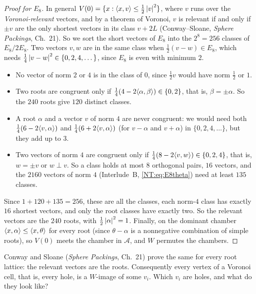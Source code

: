 \begin{proof}[Proof for $E_8$]
In general $V(0)=\{x:\langle x, v\rangle\le\frac12\left\lvert v \right\rvert^2\}$, where $v$ runs over the \emph{Voronoi-relevant} vectors,
and by a theorem of Voronoi, $v$ is relevant if and only if $\pm v$ are the only shortest vectors in its
class $v+2L$ (Conway--Sloane, \emph{Sphere Packings}, Ch.~21). So we sort the short vectors of $E_8$ into
the $2^8=256$ classes of $E_8/2E_8$. Two vectors $v,w$ are in the same class when $\frac12(v-w)\in E_8$,
which needs $\frac14\left\lvert v-w \right\rvert^2\in\{0,2,4,\dots\}$, since $E_8$ is even with minimum $2$.
\begin{itemize}[nosep]
\item No vector of norm $2$ or $4$ is in the class of $0$, since $\frac12v$ would have norm $\frac12$ or $1$.
\item Two roots are congruent only if $\frac14(4-2\langle \alpha, \beta\rangle)\in\{0,2\}$, that is, $\beta=\pm\alpha$. So the
  $240$ roots give $120$ distinct classes.
\item A root $\alpha$ and a vector $v$ of norm $4$ are never congruent: we would need both
  $\frac14(6-2\langle v, \alpha\rangle)$ and $\frac14(6+2\langle v, \alpha\rangle)$ (for $v-\alpha$ and $v+\alpha$) in $\{0,2,4,\dots\}$, but
  they add up to $3$.
\item Two vectors of norm $4$ are congruent only if $\frac14(8-2\langle v, w\rangle)\in\{0,2,4\}$, that is, $w=\pm v$ or
  $w\perp v$. So a class holds at most $8$ orthogonal pairs, $16$ vectors, and the $2160$ vectors of norm
  $4$ (Interlude~B, \eqref{NT:eq:E8theta}) need at least $135$ classes.
\end{itemize}
Since $1+120+135=256$, these are all the classes, each norm-$4$ class has exactly $16$ shortest vectors,
and only the root classes have exactly two. So the relevant vectors are the $240$ roots, with
$\frac12\left\lvert \alpha \right\rvert^2=1$. Finally, on the dominant chamber $\langle x, \alpha\rangle\le\langle x, \theta\rangle$ for every root
(since $\theta-\alpha$ is a nonnegative combination of simple roots), so $V(0)$ meets the chamber in
$\mathcal A$, and $W$ permutes the chambers.
\end{proof}

Conway and Sloane (\emph{Sphere Packings}, Ch.~21) prove the same for every root lattice: the relevant
vectors are the roots. Consequently every vertex of a Voronoi cell, that is, every hole, is a $W$-image of
some $v_i$. Which $v_i$ are holes, and what do they look like?

